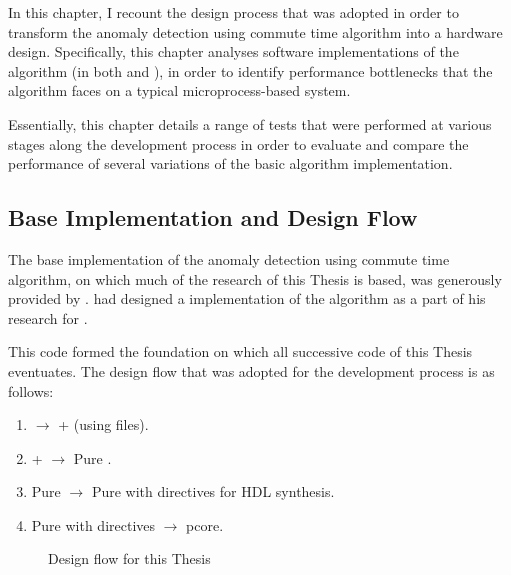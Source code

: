 In this chapter, I recount the design process that was adopted in order to
transform the anomaly detection using commute time algorithm into a hardware
design. Specifically, this chapter analyses software implementations of the
algorithm (in both  and ), in order to identify
performance bottlenecks that the algorithm faces on a typical microprocess-based
system.

Essentially, this chapter details a range of tests that were performed at
various stages along the development process in order to evaluate and compare
the performance of several variations of the basic algorithm implementation.

\subsection{Base Implementation and Design Flow}
\label{software:baseImplementation}
The base implementation of the anomaly detection using commute time algorithm,
on which much of the research of this Thesis is based, was generously provided
by \citeauthor{Khoa:2012}. \citeauthor{Khoa:2012} had designed a
 implementation of the algorithm as a part of his research for
 \cite{Khoa:2012}.

This  code formed the foundation on which all successive code
of this Thesis eventuates. The design flow that was adopted for the development
process is as follows:
\begin{enumerate}
    \item {} $\longrightarrow$
        + (using
         files).
    \item {}+ $\longrightarrow$
        Pure .
    \item Pure  $\longrightarrow$ Pure
         with  directives for \gls{HDL}
        synthesis.
    \item  Pure  with  directives
        $\longrightarrow$ pcore.
\end{enumerate}

\begin{figure}
    \centering
    
    \caption{Design flow for this Thesis}
    \label{thesis:designFlow}
\end{figure}

